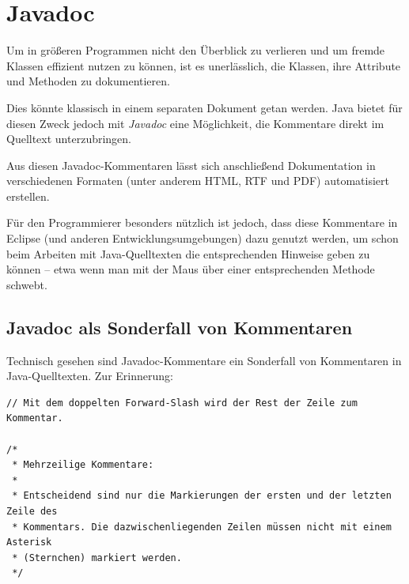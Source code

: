 \chapter{Javadoc \tagZusatz \tagLK}
\renewcommand{\chaptertitle}{Javadoc}

\lehead[]{\normalfont\sffamily\hspace*{-2.00cm}\textcolor{white}{\colorbox{lightblue}{\makebox[1.60cm][r]{\thechapter}}}\hspace{0.17cm}\textcolor{lightblue}{\chaptertitle}}
\rohead[]{\textcolor{lightblue}{\chaptertitle}\normalfont\sffamily\hspace*{0.17cm}\textcolor{white}{\colorbox{lightblue}{\makebox[1.60cm][l]{\thechapter}}}\hspace{-2.00cm}}
\rehead[]{\textcolor{lightblue}{AvHG, Inf, My}}
\lohead[]{\textcolor{lightblue}{AvHG, Inf, My}}

\lstset{style=myJava}

Um in größeren Programmen nicht den Überblick zu verlieren und um fremde
Klassen effizient nutzen zu können, ist es unerlässlich, die Klassen, ihre
Attribute und Methoden zu dokumentieren.

Dies könnte klassisch in einem separaten Dokument getan werden. Java bietet für
diesen Zweck jedoch mit {\em Javadoc} eine Möglichkeit, die Kommentare direkt im
Quelltext unterzubringen.

Aus diesen Javadoc-Kommentaren lässt sich anschließend Dokumentation in
verschiedenen Formaten (unter anderem HTML, RTF und PDF) automatisiert
erstellen.

Für den Programmierer besonders nützlich ist jedoch, dass diese Kommentare in
Eclipse (und anderen Entwicklungsumgebungen) dazu genutzt werden, um schon beim
Arbeiten mit Java-Quelltexten die entsprechenden Hinweise geben zu können --
etwa wenn man mit der Maus über einer entsprechenden Methode schwebt.


\section{Javadoc als Sonderfall von Kommentaren}

Technisch gesehen sind Javadoc-Kommentare ein Sonderfall von Kommentaren in
Java-Quelltexten. Zur Erinnerung:

\begin{lstlisting}
// Mit dem doppelten Forward-Slash wird der Rest der Zeile zum Kommentar.

/* 
 * Mehrzeilige Kommentare:
 *
 * Entscheidend sind nur die Markierungen der ersten und der letzten Zeile des
 * Kommentars. Die dazwischenliegenden Zeilen müssen nicht mit einem Asterisk
 * (Sternchen) markiert werden.
 */
\end{lstlisting}

